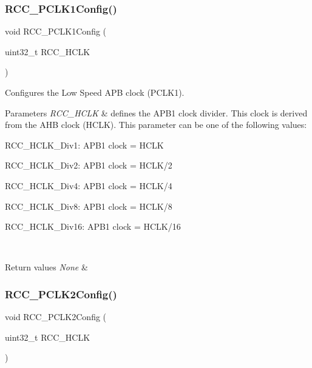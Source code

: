 \subsubsection{\texorpdfstring{R\+C\+C\+\_\+\+P\+C\+L\+K1\+Config()}{RCC\_PCLK1Config()}}
{\footnotesize\ttfamily void R\+C\+C\+\_\+\+P\+C\+L\+K1\+Config (\begin{DoxyParamCaption}\item[{uint32\+\_\+t}]{R\+C\+C\+\_\+\+H\+C\+LK }\end{DoxyParamCaption})}



Configures the Low Speed A\+PB clock (P\+C\+L\+K1). 


\begin{DoxyParams}{Parameters}
{\em R\+C\+C\+\_\+\+H\+C\+LK} & defines the A\+P\+B1 clock divider. This clock is derived from the A\+HB clock (H\+C\+LK). This parameter can be one of the following values\+: \begin{DoxyItemize}
\item R\+C\+C\+\_\+\+H\+C\+L\+K\+\_\+\+Div1\+: A\+P\+B1 clock = H\+C\+LK \item R\+C\+C\+\_\+\+H\+C\+L\+K\+\_\+\+Div2\+: A\+P\+B1 clock = H\+C\+L\+K/2 \item R\+C\+C\+\_\+\+H\+C\+L\+K\+\_\+\+Div4\+: A\+P\+B1 clock = H\+C\+L\+K/4 \item R\+C\+C\+\_\+\+H\+C\+L\+K\+\_\+\+Div8\+: A\+P\+B1 clock = H\+C\+L\+K/8 \item R\+C\+C\+\_\+\+H\+C\+L\+K\+\_\+\+Div16\+: A\+P\+B1 clock = H\+C\+L\+K/16 \end{DoxyItemize}
\\
\hline
\end{DoxyParams}

\begin{DoxyRetVals}{Return values}
{\em None} & \\
\hline
\end{DoxyRetVals}
\mbox{\label{group___r_c_c_ga09f9c010a4adca9e036da42c2ca6126a}} 
\subsubsection{\texorpdfstring{R\+C\+C\+\_\+\+P\+C\+L\+K2\+Config()}{RCC\_PCLK2Config()}}
{\footnotesize\ttfamily void R\+C\+C\+\_\+\+P\+C\+L\+K2\+Config (\begin{DoxyParamCaption}\item[{uint32\+\_\+t}]{R\+C\+C\+\_\+\+H\+C\+LK }\end{DoxyParamCaption})}



